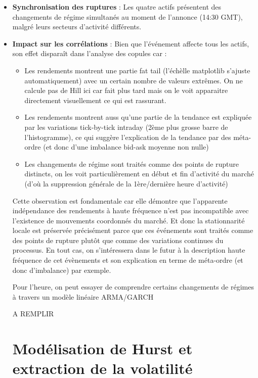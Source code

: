 \documentclass[10pt,a4paper]{article}
\theoremstyle{definition}
\theoremstyle{remark}
\begin{document}
\begin{itemize}
    \item \textbf{Synchronisation des ruptures} : Les quatre actifs présentent des changements de régime simultanés au moment de l'annonce (14:30 GMT), malgré leurs secteurs d'activité différents.

    \item \textbf{Impact sur les corrélations} : Bien que l'événement affecte tous les actifs, son effet disparaît dans l'analyse des copules car :
\begin{itemize}
        \item Les rendements montrent une partie fat tail (l'échèlle matplotlib s'ajuste automatiquement) avec un certain nombre de valeurs extrêmes. On ne calcule pas de Hill ici car fait plus tard mais on le voit apparaitre directement visuellement ce qui est rassurant.
        \item Les rendements montrent auss qu'une partie de la tendance est expliquée par les variations tick-by-tick intraday (2ème plus grosse barre de l'histogramme), ce qui suggère l'explication de la tendance par des méta-ordre (et donc d'une imbalance bid-ask moyenne non nulle)
        \item Les changements de régime sont traités comme des points de rupture distincts, on les voit particulièrement en début et fin d'activité  du marché (d'où la suppression générale de la 1ère/dernière heure d'activité)
\end{itemize}


Cette observation est fondamentale car elle démontre que l'apparente indépendance des rendements à haute fréquence n'est pas incompatible avec l'existence de mouvements coordonnés du marché. 
Et donc la stationnarité locale est préservée précisément parce que ces événements sont traités comme des points de rupture plutôt que comme des variations continues du processus.
En tout cas, on s'intéressera dans le futur à la description haute fréquence de cet évènements et son explication en terme de méta-ordre (et donc d'imbalance) par exemple. 


Pour l'heure, on peut essayer de comprendre certains changements de régimes à travers un modèle linéaire ARMA/GARCH

A REMPLIR


\newpage
\section{Modélisation de Hurst et extraction de la volatilité}


\end{itemize}
\end{document}
